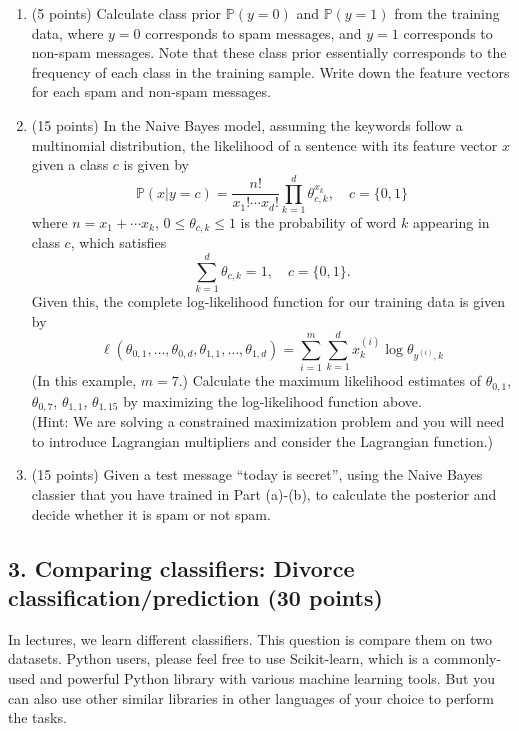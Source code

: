 \documentclass[twoside,10pt]{article}
\begin{document}
\begin{enumerate}
\item (5 points) Calculate class prior $\mathbb P(y = 0)$ and $\mathbb P(y = 1)$ from the training data, where $y = 0$ corresponds to spam messages, and $y = 1$ corresponds to non-spam messages. Note that these class prior essentially corresponds to the frequency of each class in the training sample. Write down the feature vectors for each spam and non-spam messages.
\item (15 points)  In the Naive Bayes model, assuming the keywords follow a multinomial distribution, the likelihood of a sentence with its feature vector $x$ given a class $c$ is given by 
\[
 \mathbb P (x|y = c) = \frac{n!}{x_1! \cdots x_d!}\prod_{k=1}^d \theta_{c, k}^{x_k}, \quad c = \{0, 1\}
\]
where $n = x_1 + \cdots x_k$, $0 \leq \theta_{c,k} \leq 1$ is the probability of word $k$ appearing in class $c$, which satisfies 
\[\sum_{k=1}^d \theta_{c,k} = 1, \quad c = \{0, 1\}.\] Given this, the complete log-likelihood function for our training data is given by
\[
\ell(\theta_{0,1}, \ldots, \theta_{0, d}, \theta_{1,1}, \ldots, \theta_{1, d}) = 
\sum_{i=1}^m \sum_{k=1}^d x_k^{(i)} \log \theta_{y^{(i)}, k}
\]
(In this example, $m = 7$.)
 Calculate the maximum likelihood estimates of $\theta_{0,1}$, $\theta_{0,7}$, $\theta_{1,1}$, $\theta_{1,15}$ by maximizing the log-likelihood function above.\\
 (Hint: We are solving a constrained maximization problem and you will need to introduce Lagrangian multipliers and consider the Lagrangian function.)
\item (15 points) Given a test message ``\textsf{today is secret}'', using the Naive Bayes classier that you have trained in Part (a)-(b), to calculate the posterior and decide whether it is spam or not spam.

\end{enumerate}


\subsection*{\bf 3. Comparing classifiers: Divorce classification/prediction (30 points)}

In lectures, we learn different classifiers. This question is compare them on two datasets. Python users, please feel free to use \textsf{Scikit-learn}, which is a commonly-used and powerful \textsf{Python} library with various machine learning tools. But you can also use other similar libraries in other languages of your choice to perform the tasks.
\end{document}
